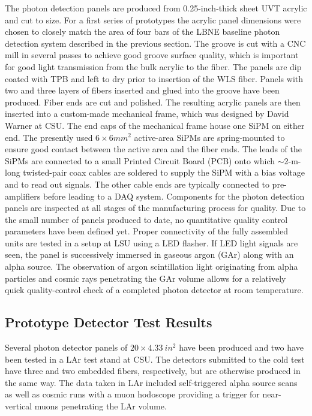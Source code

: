 The photon detection panels are produced from 0.25-inch-thick sheet
UVT acrylic and cut to size. For a first series of prototypes the
acrylic panel dimensions were chosen to closely match the area of four
bars of the LBNE baseline photon detection system described in the
previous section.  The groove is cut with a CNC mill in several passes
to achieve good groove surface quality, which is important for good
light transmission from the bulk acrylic to the fiber. The panels are
dip coated with TPB and left to dry prior to insertion of the WLS
fiber. Panels with two and three layers of fibers inserted and glued
into the groove have been produced. Fiber ends are cut and polished.
The resulting acrylic panels are then inserted into a custom-made
mechanical frame, which was designed by David Warner at CSU.  The end
caps of the mechanical frame house one SiPM on either end. The
presently used $6\times6 mm^2$ active-area SiPMs are spring-mounted to
ensure good contact between the active area and the fiber ends.  The
leads of the SiPMs are connected to a small Printed Circuit Board
(PCB) onto which $\sim$2-m-long twisted-pair coax cables are soldered
to supply the SiPM with a bias voltage and to read out signals. The
other cable ends are typically connected to pre-amplifiers before
leading to a DAQ system.  Components for the photon detection panels
are inspected at all stages of the manufacturing process for
quality. Due to the small number of panels produced to date, no
quantitative quality control parameters have been defined yet.  Proper
connectivity of the fully assembled units are tested in a setup at LSU
using a LED flasher. If LED light signals are seen, the panel is
successively immersed in gaseous argon (GAr) along with an alpha
source. The observation of argon scintillation light originating from
alpha particles and cosmic rays penetrating the GAr volume allows for
a relatively quick quality-control check of a completed photon
detector at room temperature.

\subsection{Prototype Detector Test Results}

Several photon detector panels of $20 \times 4.33~in^2$ have been
produced and two have been tested in a LAr test stand at CSU. The
detectors submitted to the cold test have three and two embedded fibers,
respectively, but are otherwise produced in the same way. The data
taken in LAr included self-triggered alpha source scans as well as
cosmic runs with a muon hodoscope providing a trigger for near-vertical muons penetrating the LAr volume.
